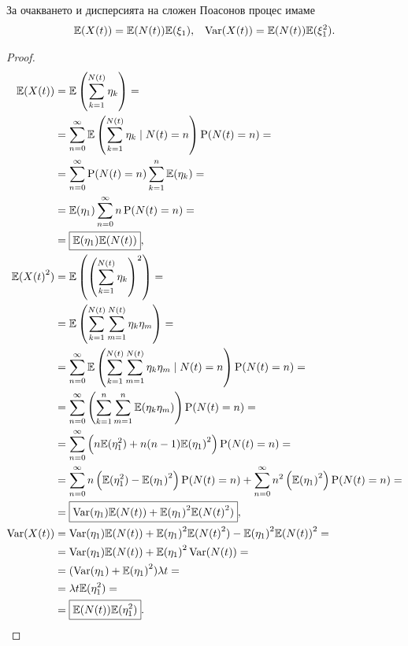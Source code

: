 \documentclass[numbers=endperiod, bibliography=totocnumbered]{scrartcl}
\begin{document}
\begin{theorem}
  За очакването и дисперсията на сложен Поасонов процес имаме
  \begin{align*}
    \mathbb{E}(X(t)) = \mathbb{E}(N(t)) \mathbb{E}(\xi_1),
    &&
    \operatorname{Var}(X(t)) = \mathbb{E}(N(t)) \mathbb{E}(\xi_1^2).
  \end{align*}
\end{theorem}
\begin{proof}
  \begin{align*}
    \mathbb{E}(X(t))
    &=
    \mathbb{E}\left( \sum_{k=1}^{N(t)} \eta_k \right)
    = \\ &=
    \sum_{n=0}^\infty \mathbb{E}\left( \sum_{k=1}^{N(t)} \eta_k \mid N(t) = n \right) \operatorname{P}(N(t) = n)
    = \\ &=
    \sum_{n=0}^\infty \operatorname{P}(N(t) = n) \sum_{k=1}^n \mathbb{E}(\eta_k)
    = \\ &=
    \mathbb{E}(\eta_1) \sum_{n=0}^\infty n \operatorname{P}(N(t) = n)
    = \\ &=
    \boxed{\mathbb{E}(\eta_1) \mathbb{E}(N(t))},
    \\
    \mathbb{E}({X(t)}^2)
    &=
    \mathbb{E}\left( {\left(\sum_{k=1}^{N(t)} \eta_k \right)}^2 \right)
    = \\ &=
    \mathbb{E}\left( \sum_{k=1}^{N(t)} \sum_{m=1}^{N(t)} \eta_k \eta_m \right)
    = \\ &=
    \sum_{n=0}^\infty \mathbb{E}\left( \sum_{k=1}^{N(t)} \sum_{m=1}^{N(t)} \eta_k \eta_m \mid N(t) = n \right) \operatorname{P}(N(t) = n)
    = \\ &=
    \sum_{n=0}^\infty \left( \sum_{k=1}^n \sum_{m=1}^n \mathbb{E}(\eta_k \eta_m) \right) \operatorname{P}(N(t) = n)
    = \\ &=
    \sum_{n=0}^\infty \left( n \mathbb{E}(\eta_1^2) + n (n-1) {\mathbb{E}(\eta_1)}^2 \right) \operatorname{P}(N(t) = n)
    = \\ &=
    \sum_{n=0}^\infty n \left( \mathbb{E}(\eta_1^2) - {\mathbb{E}(\eta_1)}^2 \right) \operatorname{P}(N(t) = n) + \sum_{n=0}^\infty n^2 \left( {\mathbb{E}(\eta_1)}^2 \right) \operatorname{P}(N(t) = n)
    = \\ &=
    \boxed{\operatorname{Var}(\eta_1) \mathbb{E}(N(t)) + {\mathbb{E}(\eta_1)}^2 \mathbb{E}({N(t)}^2)},
    \\
    \operatorname{Var}(X(t))
    &=
    \operatorname{Var}(\eta_1) \mathbb{E}(N(t)) + {\mathbb{E}(\eta_1)}^2 \mathbb{E}({N(t)}^2) - {\mathbb{E}(\eta_1)}^2 {\mathbb{E}(N(t))}^2
    = \\ &=
    \operatorname{Var}(\eta_1) \mathbb{E}(N(t)) + {\mathbb{E}(\eta_1)}^2 \operatorname{Var}(N(t))
    = \\ &=
    (\operatorname{Var}(\eta_1) + {\mathbb{E}(\eta_1)}^2) \lambda t
    = \\ &=
    \lambda t \mathbb{E}(\eta_1^2)
    = \\ &=
    \boxed{\mathbb{E}(N(t)) \mathbb{E}(\eta_1^2)}.
  \end{align*}
\end{proof}
\end{document}
